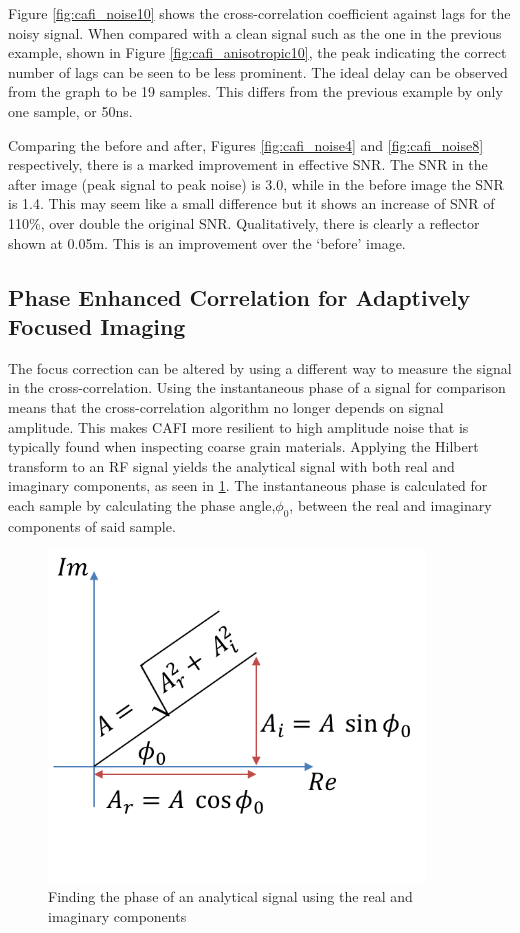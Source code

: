 Figure \ref{fig:cafi_noise10} shows the cross-correlation coefficient against lags for the noisy signal. When compared with a clean signal such as the one in the previous example, shown in Figure \ref{fig:cafi_anisotropic10}, the peak indicating the correct number of lags can be seen to be less prominent. The ideal delay can be observed from the graph to be 19 samples. This differs from the previous example by only one sample, or 50ns.

Comparing the before and after, Figures \ref{fig:cafi_noise4} and \ref{fig:cafi_noise8} respectively, there is a marked improvement in effective SNR. The SNR in the after image (peak signal to peak noise) is 3.0, while in the before image the SNR is 1.4. This may seem like a small difference but it shows an increase of SNR of 110\%, over double the original SNR. Qualitatively, there is clearly a reflector shown at 0.05m. This is an improvement over the `before' image.
\clearpage
\subsection{Phase Enhanced Correlation for Adaptively Focused Imaging}

The focus correction can be altered by using a different way to measure the signal in the cross-correlation. Using the instantaneous phase of a signal for comparison means that the cross-correlation algorithm no longer depends on signal amplitude. This makes CAFI more resilient to high amplitude noise that is typically found when inspecting coarse grain materials\cite{camacho_phase_2011}. Applying the Hilbert transform to an RF signal yields the analytical signal with both real and imaginary components, as seen in \ref{fig:cafi_phases}. The instantaneous phase is calculated for each sample by calculating the phase angle,$\phi_{0}$, between the real and imaginary components of said sample.

\begin{figure}[hp]
\centering
		\includegraphics[width=100mm]{Phases2.png}
		\caption{Finding the phase of an analytical signal using the real and imaginary components}
		\label{fig:cafi_phases}
\end{figure}

